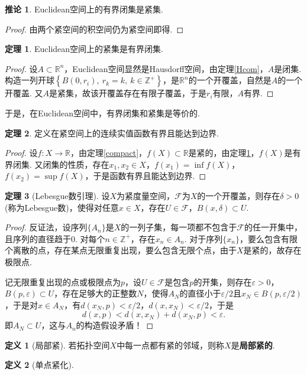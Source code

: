 \documentclass[12pt]{ctexart}
\theoremstyle{definition}
\newtheorem{definition}{定义}
\newtheorem{theorem}{定理}
\newtheorem{corollary}{推论}
\theoremstyle{plain}
\begin{document}
	\begin{corollary}
		Euclidean空间上的有界闭集是紧集.
	\end{corollary}
	\begin{proof}
		由两个紧空间的积空间仍为紧空间即得.
	\end{proof}
	\begin{theorem}\label{comclose}
		Euclidean空间上的紧集是有界闭集.
	\end{theorem}
	\begin{proof}
		设$A\subset\mathbb{R}^n$，Euclidean空间显然是Hausdorff空间，由定理\ref{Hcom}，$A$是闭集. 构造一列开球$\left\{B(0,r_i),\ r_k=k,\ k\in\mathbb{Z}^+\right\}$，是$\mathbb{R}^n$的一个开覆盖，自然是$A$的一个开覆盖. 又$A$是紧集，故该开覆盖存在有限子覆盖，于是$r_i$有限，$A$有界.
	\end{proof}
	于是，在Euclidean空间中，有界闭集和紧集是等价的.
	\begin{theorem}
		定义在紧空间上的连续实值函数有界且能达到边界.
	\end{theorem}
	\begin{proof}
		设$f:X\to\mathbb{R}$，由定理\ref{compact}，$f(X)\subset\mathbb{R}$是紧的，由定理\ref{comclose}，$f(X)$是有界闭集. 又闭集的性质，存在$x_1,x_2\in X$，$f(x_1)=\inf f(X)$，$f(x_2)=\sup f(X)$，于是函数有界且能达到边界.
	\end{proof}
	\begin{theorem}[Lebesgue数引理]
		设$X$为紧度量空间，$\mathcal{F}$为$X$的一个开覆盖，则存在$\delta>0$(称为Lebesgue数)，使得对任意$x\in X$，存在$U\in\mathcal{F}$，$B(x,\delta)\subset U$.
	\end{theorem}
	\begin{proof}
		反证法，设序列$\{A_n\}$是$X$的一列子集，每一项都不包含于$\mathcal{F}$的任一开集中，且序列的直径趋于$0$. 对每个$n\in\mathbb{Z}^+$，存在$x_n\in A_n$. 对于序列$\{x_n\}$，要么包含有限个离散的点，存在某点无限重复出现，要么包含无限个点，由于$X$是紧的，故存在极限点. 
		
		记无限重复出现的点或极限点为$p$，设$U\in\mathcal{F}$是包含$p$的开集，则存在$\varepsilon>0$，$B(p,\varepsilon)\subset U$，存在足够大的正整数$N$，使得$A_N$的直径小于$\varepsilon/2$且$x_N\in B(p,\varepsilon/2)$，于是对$x\in A_N$，有$d(x_N,p)<\varepsilon/2$，$d(x,x_N)<\varepsilon/2$，于是
		$$d(x,p)<d(x,x_N)+d(x_N,p)<\varepsilon.$$
		即$A_N\subset U$，这与$A_n$的构造假设矛盾！
	\end{proof}
	\begin{definition}[局部紧]
		若拓扑空间$X$中每一点都有紧的邻域，则称$X$是\textbf{局部紧的}.
	\end{definition}
	\begin{definition}[单点紧化]
		
	\end{definition}
\end{document}
